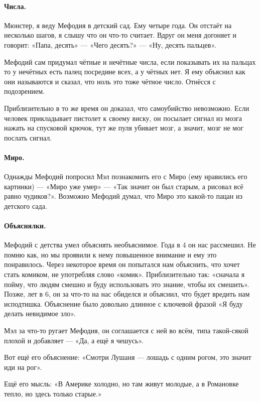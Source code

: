 \documentclass{book}
\begin{document}
\paragraph{Числа.} Мюнстер, я веду Мефодия в детский сад.
Ему четыре года.
Он отстаёт на несколько шагов, 
я слышу что он что-то считает.
Вдруг он меня догоняет и говорит:
«Папа, десять» --- «Чего десять?» --- «Ну, десять пальцев».

Мефодий сам придумал чётные и нечётные числа, если показывать их на пальцах то у нечётных есть палец посредине всех, а у чётных нет.
Я ему объяснил как они называются и сказал, что ноль это тоже чётное число.
Отнёсся с подозрением.

Приблизительно в то же время он доказал, что самоубийство невозможно.
Если человек прикладывает пистолет к своему виску, он посылает сигнал из мозга нажать на спусковой крючок, тут же пуля убивает мозг, а значит, мозг не мог послать сигнал.

\paragraph{Миро.} Однажды Мефодий попросил Мэл познакомить его с Миро (ему нравились его картинки) --- «Миро уже умер» --- «Так значит он был старым, а рисовал всё равно чудиков?».
Возможно Мефодий думал, что Миро это какой-то пацан из детского сада.


\paragraph{Объяснялки.} Мефодий с детства умел объяснять необъяснимое. 
Года в 4 он нас рассмешил.
Не помню как, но мы проявили к нему повышенное внимание и ему это понравилось.
Через некоторое время он попытался нам объяснить, что хочет стать комиком, не употребляя слово «комик».
Приблизительно так: «сначала я пойму, что людям смешно и буду использовать это знание, чтобы их смешить».
Позже, лет в 6, он за что-то на нас обиделся и объяснил, что будет вредить нам исподтишка.
Объяснение было довольно длинное с ключевой фразой «Я буду делать невидимое зло».

Мэл за что-то ругает Мефодия, он соглашается с ней во всём, типа такой-сякой плохой и добавляет --- «Да, а ещё я чешусь».

Вот ещё его объяснение: «Смотри Лушаня --- лошадь с одним рогом, это значит иди на рог».

Ещё его мысль: «В Америке холодно, но там живут молодые, а в Романовке тепло, но здесь только старые.» 
\end{document}
